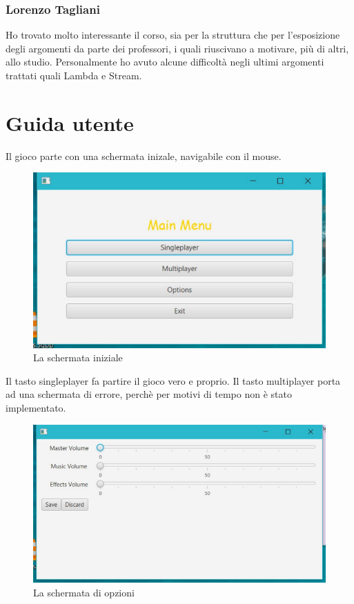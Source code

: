 \documentclass[a4paper,12pt]{report}
\begin{document}
\subsection{Lorenzo Tagliani}
Ho trovato molto interessante il corso, sia per la struttura che per l'esposizione degli argomenti da parte dei professori, i quali riuscivano a motivare, più di altri,
allo studio. Personalmente ho avuto alcune difficoltà negli ultimi argomenti trattati quali Lambda e Stream.
\appendix
\chapter{Guida utente}

Il gioco parte con una schermata inizale, navigabile con il mouse. 
\begin{figure}[H]
	\centering{}
	\includegraphics[width=\textwidth]{img/main_menu.pdf}
	\caption{La schermata iniziale}
\end{figure}
Il tasto singleplayer fa partire il gioco vero e proprio. 
Il tasto multiplayer porta ad una schermata di errore, perchè per motivi di tempo non è stato implementato. 
\begin{figure}[H]
	\centering{}
	\includegraphics[width=\textwidth]{img/options.pdf}
	\caption{La schermata di opzioni}
\end{figure}
\end{document}
